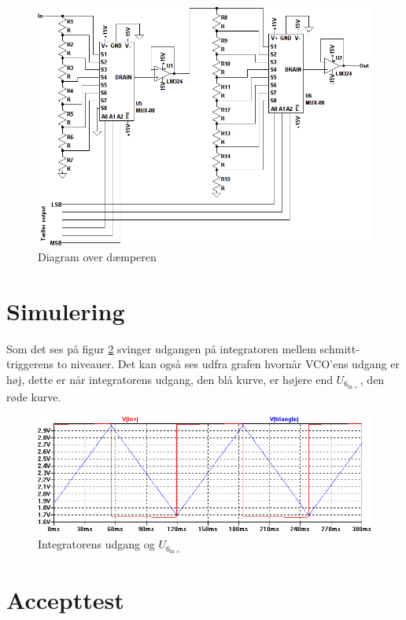 \begin{figure}[h]
\centering
\includegraphics[width=\textwidth]{teknisk/volumenkontrol/daemper.png}
\caption{Diagram over dæmperen}
\label{fig:volumenkontrol_daemper}
\end{figure}

\section{Simulering}
\label{volumenkontrol-simulering}

Som det ses på figur \ref{fig:vco-signal} svinger udgangen på integratoren mellem schmitt-triggerens to niveauer. Det kan også ses udfra grafen hvornår VCO'ens udgang er høj, dette er når integratorens udgang, den blå kurve, er højere end $U_{6_{\mathrm{in+}}}$, den røde kurve.

\begin{figure}[h]
\centering
\includegraphics[width=\textwidth]{teknisk/volumenkontrol/vco-signal.png}
\caption{Integratorens udgang og $U_{6_{\mathrm{in+}}}$}
\label{fig:vco-signal}
\end{figure}


\section{Accepttest}
\label{volumenkontrol-accepttest}


